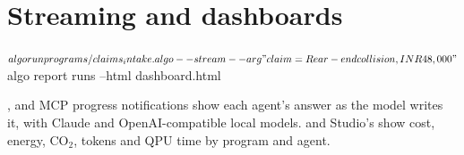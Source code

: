 \section{Streaming and dashboards}

\begin{terminal}
$ algo run programs/claims_intake.algo --stream --arg "claim=Rear-end collision, INR 48,000"
$ algo report runs --html dashboard.html
\end{terminal}

,  and MCP progress notifications show each agent's answer as the model writes it, with Claude and OpenAI-compatible local models.  and Studio's  show cost, energy, CO$_2$, tokens and QPU time by program and agent.
